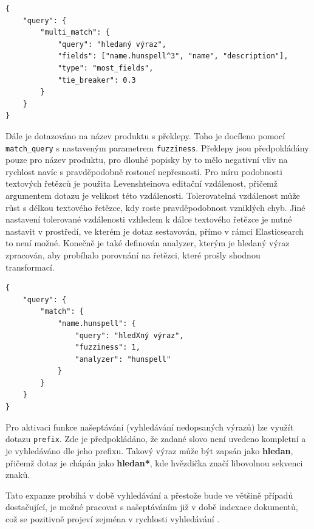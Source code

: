 \documentclass[FM,DP]{tulthesis}
\newenvironment{code}
    {\filbreak\captionsetup{type=listing}}{\filbreak}
\begin{document}
\begin{code}
\captionsetup{singlelinecheck=false,justification=raggedright}
\label{code:es-search-1}
\begin{verbatim}
{
    "query": {
        "multi_match": {
            "query": "hledaný výraz", 
            "fields": ["name.hunspell^3", "name", "description"],
            "type": "most_fields",
            "tie_breaker": 0.3
        }
    }
}
\end{verbatim}
\end{code}

Dále je dotazováno na název produktu s překlepy. Toho je docíleno pomocí \verb|match_query|
s nastaveným parametrem \verb|fuzziness|. Překlepy jsou předpokládány pouze pro název produktu, 
pro dlouhé popisky by to mělo negativní vliv na rychlost navíc s pravděpodobně rostoucí
nepřesností. Pro míru podobnosti textových řetězců je použita Levenshteinova editační
vzdálenost, přičemž argumentem dotazu je velikost této vzdálenosti. Tolerovatelná vzdálenost
může růst s délkou textového řetězce, kdy roste pravděpodobnost vzniklých chyb. Jiné
nastavení tolerované vzdálenosti vzhledem k dálce textového řetězce je nutné nastavit
v prostředí, ve kterém je dotaz sestavován, přímo v rámci Elasticsearch to není možné.
Konečně je také definován analyzer, kterým je hledaný výraz zpracován, aby probíhalo porovnání
na řetězci, které prošly shodnou transformací.

\begin{code}
\captionsetup{singlelinecheck=false,justification=raggedright}
\label{code:es-search-2}
\begin{verbatim}
{
    "query": {
        "match": {
            "name.hunspell": {
                "query": "hledXný výraz",
                "fuzziness": 1,
                "analyzer": "hunspell"
            }
        }
    }
}
\end{verbatim}
\end{code}

Pro aktivaci funkce našeptávání (vyhledávání nedopsaných výrazů) lze využít dotazu \verb|prefix|.
Zde je předpokládáno, že zadané slovo není uvedeno kompletní a je vyhledáváno
dle jeho prefixu. Takový výraz může být zapsán jako \textbf{hledan}, přičemž dotaz je chápán
jako \textbf{hledan*}, kde hvězdička značí libovolnou sekvenci znaků.

Tato expanze probíhá v době vyhledávání a přestože bude ve většině případů dostačující, 
je možné pracovat s našeptáváním již v době indexace dokumentů, což se pozitivně projeví zejména 
v rychlosti vyhledávání \cite{es-suggester}.
\end{document}
